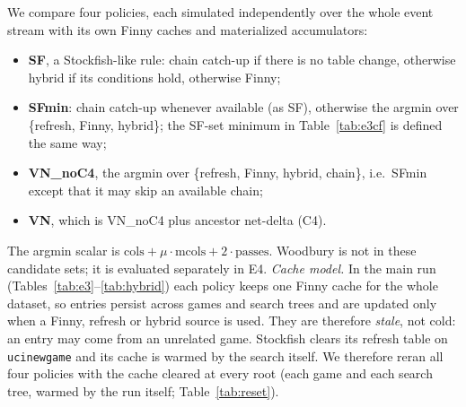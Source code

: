 We compare four policies, each simulated independently over the whole event stream with its own Finny caches and materialized accumulators:
\begin{itemize}[leftmargin=*,itemsep=1pt]
\item \textbf{SF}, a Stockfish-like rule: chain catch-up if there is no table change, otherwise hybrid if its conditions hold, otherwise Finny;
\item \textbf{SFmin}: chain catch-up whenever available (as SF), otherwise the argmin over \{refresh, Finny, hybrid\}; the SF-set minimum in Table~\ref{tab:e3cf} is defined the same way;
\item \textbf{VN\_noC4}, the argmin over \{refresh, Finny, hybrid, chain\}, i.e.\ SFmin except that it may skip an available chain;
\item \textbf{VN}, which is VN\_noC4 plus ancestor net-delta (C4).
\end{itemize}
The argmin scalar is $\mathrm{cols}+\mu\cdot\mathrm{mcols}+2\cdot\mathrm{passes}$.
Woodbury is not in these candidate sets; it is evaluated separately in E4.
\emph{Cache model.} In the main run (Tables~\ref{tab:e3}--\ref{tab:hybrid}) each policy keeps one Finny cache for the whole dataset, so entries persist across games and search trees and are updated only when a Finny, refresh or hybrid source is used.
They are therefore \emph{stale}, not cold: an entry may come from an unrelated game.
Stockfish clears its refresh table on \texttt{ucinewgame} and its cache is warmed by the search itself.
We therefore reran all four policies with the cache cleared at every root (each game and each search tree, warmed by the run itself; Table~\ref{tab:reset}).



